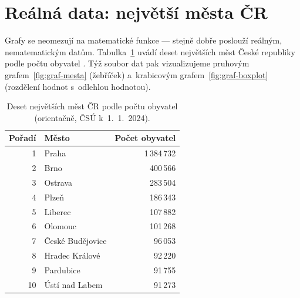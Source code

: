 \documentclass[11pt, a4paper, oneside]{book}
\begin{document}
\section{Reálná data: největší města ČR}
\label{sec:mesta}

Grafy se neomezují na matematické funkce — stejně dobře poslouží reálným,
nematematickým datům. Tabulka~\ref{tab:mesta} uvádí deset největších měst České
republiky podle počtu obyvatel \cite{csu}. Týž soubor dat pak vizualizujeme
pruhovým grafem~\ref{fig:graf-mesta} (žebříček) a~krabicovým
grafem~\ref{fig:graf-boxplot} (rozdělení hodnot s~odlehlou hodnotou).

\begin{table}[htbp]
\centering
\caption{Deset největších měst ČR podle počtu obyvatel
(orientačně, ČSÚ k~1.~1.~2024).}
\label{tab:mesta}
\begin{tabular}{rlr}
\toprule
Pořadí & Město & Počet obyvatel \\
\midrule
1  & Praha            & 1\,384\,732 \\
2  & Brno             &   400\,566 \\
3  & Ostrava          &   283\,504 \\
4  & Plzeň            &   186\,343 \\
5  & Liberec          &   107\,882 \\
6  & Olomouc          &   101\,268 \\
7  & České Budějovice &    96\,053 \\
8  & Hradec Králové   &    92\,220 \\
9  & Pardubice        &    91\,755 \\
10 & Ústí nad Labem   &    91\,273 \\
\bottomrule
\end{tabular}
\end{table}
\end{document}

